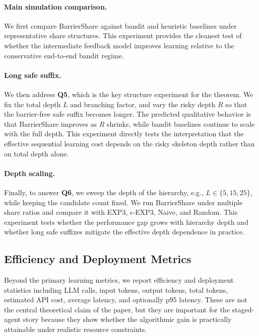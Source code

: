 \documentclass{article}
\begin{document}
\paragraph{Main simulation comparison.}
We first compare BarrierShare against bandit and heuristic baselines under representative share structures. This experiment provides the cleanest test of whether the intermediate feedback model improves learning relative to the conservative end-to-end bandit regime.

\paragraph{Long safe suffix.}
We then address \textbf{Q5}, which is the key structure experiment for the theorem. We fix the total depth $L$ and branching factor, and vary the risky depth $R$ so that the barrier-free safe suffix becomes longer. The predicted qualitative behavior is that BarrierShare improves as $R$ shrinks, while bandit baselines continue to scale with the full depth. This experiment directly tests the interpretation that the effective sequential learning cost depends on the risky skeleton depth rather than on total depth alone.

\paragraph{Depth scaling.}
Finally, to answer \textbf{Q6}, we sweep the depth of the hierarchy, e.g., $L \in \{5, 15, 25\}$, while keeping the candidate count fixed. We run BarrierShare under multiple share ratios and compare it with EXP3, $\epsilon$-EXP3, Naive, and Random. This experiment tests whether the performance gap grows with hierarchy depth and whether long safe suffixes mitigate the effective depth dependence in practice.

\subsection{Efficiency and Deployment Metrics}

Beyond the primary learning metrics, we report efficiency and deployment statistics including LLM calls, input tokens, output tokens, total tokens, estimated API cost, average latency, and optionally p95 latency. These are not the central theoretical claim of the paper, but they are important for the staged-agent story because they show whether the algorithmic gain is practically attainable under realistic resource constraints.
\end{document}
